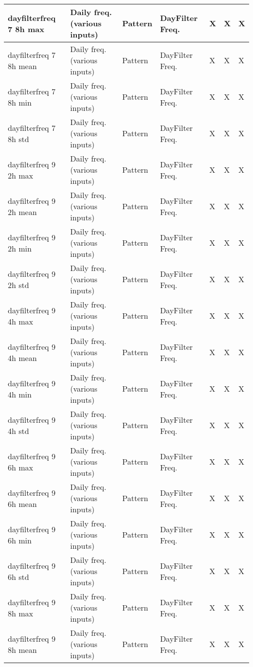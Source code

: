 {{\begin{longtable}[l]{ | p{4cm} | p{4cm} | p{1cm} | p{2cm} | p{0.3cm} | p{0.3cm} | p{0.3cm} |}
	 dayfilterfreq 7 8h max & Daily freq. (various inputs) & Pattern & DayFilter Freq. & X & X & X \\ \hline
	 dayfilterfreq 7 8h mean & Daily freq. (various inputs) & Pattern & DayFilter Freq. & X & X & X \\ \hline
	 dayfilterfreq 7 8h min & Daily freq. (various inputs) & Pattern & DayFilter Freq. & X & X & X \\ \hline
	 dayfilterfreq 7 8h std & Daily freq. (various inputs) & Pattern & DayFilter Freq. & X & X & X \\ \hline
	 dayfilterfreq 9 2h max & Daily freq. (various inputs) & Pattern & DayFilter Freq. & X & X & X \\ \hline
	 dayfilterfreq 9 2h mean & Daily freq. (various inputs) & Pattern & DayFilter Freq. & X & X & X \\ \hline
	 dayfilterfreq 9 2h min & Daily freq. (various inputs) & Pattern & DayFilter Freq. & X & X & X \\ \hline
	 dayfilterfreq 9 2h std & Daily freq. (various inputs) & Pattern & DayFilter Freq. & X & X & X \\ \hline
	 dayfilterfreq 9 4h max & Daily freq. (various inputs) & Pattern & DayFilter Freq. & X & X & X \\ \hline
	 dayfilterfreq 9 4h mean & Daily freq. (various inputs) & Pattern & DayFilter Freq. & X & X & X \\ \hline
	 dayfilterfreq 9 4h min & Daily freq. (various inputs) & Pattern & DayFilter Freq. & X & X & X \\ \hline
	 dayfilterfreq 9 4h std & Daily freq. (various inputs) & Pattern & DayFilter Freq. & X & X & X \\ \hline
	 dayfilterfreq 9 6h max & Daily freq. (various inputs) & Pattern & DayFilter Freq. & X & X & X \\ \hline
	 dayfilterfreq 9 6h mean & Daily freq. (various inputs) & Pattern & DayFilter Freq. & X & X & X \\ \hline
	 dayfilterfreq 9 6h min & Daily freq. (various inputs) & Pattern & DayFilter Freq. & X & X & X \\ \hline
	 dayfilterfreq 9 6h std & Daily freq. (various inputs) & Pattern & DayFilter Freq. & X & X & X \\ \hline
	 dayfilterfreq 9 8h max & Daily freq. (various inputs) & Pattern & DayFilter Freq. & X & X & X \\ \hline
	 dayfilterfreq 9 8h mean & Daily freq. (various inputs) & Pattern & DayFilter Freq. & X & X & X \\ \hline

\end{longtable}}}
